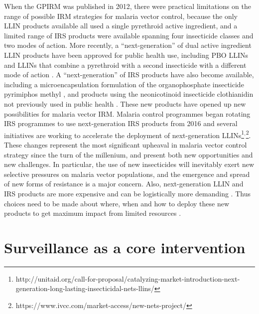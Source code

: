 \documentclass[a4paper,11pt,abstracton,hidelinks]{scrartcl}
\begin{document}
When the GPIRM was published in 2012, there were practical limitations on the range of possible IRM strategies for malaria vector control, because the only LLIN products available all used a single pyrethroid active ingredient, and a limited range of IRS products were available spanning four insecticide classes and two modes of action.
%
More recently, a ``next-generation'' of dual active ingredient LLIN products have been approved for public health use, including PBO LLINs \citep{Gleave2018} and LLINs that combine a pyrethroid with a second insecticide with a different mode of action \citep{Bayili2017,Tiono2018}.
%
A ``next-generation'' of IRS products have also become available, including a microencapsulation formulation of the organophosphate insecticide pyrimiphos methyl \citep{Oxborough2014}, and products using the neonicotinoid insecticide clothianidin not previously used in public health \citep{Oxborough2019}.
%
These new products have opened up new possibilities for malaria vector IRM.
%
Malaria control programmes began rotating IRS programmes to use next-generation IRS products from 2016 \citep{Tangena2020} and several initiatives are working to accelerate the deployment of next-generation LLINs\footnote{http://unitaid.org/call-for-proposal/catalyzing-market-introduction-next-generation-long-lasting-insecticidal-nets-llins/}$^{,}$\footnote{https://www.ivcc.com/market-access/new-nets-project/}.
%
These changes represent the most significant upheaval in malaria vector control strategy since the turn of the millenium, and present both new opportunities and new challenges.
%
In particular, the use of new insecticides will inevitably exert new selective pressures on malaria vector populations, and the emergence and spread of new forms of resistance is a major concern.
%
Also, next-generation LLIN and IRS products are more expensive and can be logistically more demanding \citep{TenBrink2018}.
%
Thus choices need to be made about where, when and how to deploy these new products to get maximum impact from limited resources \citep{WHO2017PBOLLIN}.


\section{Surveillance as a core intervention}
\end{document}
